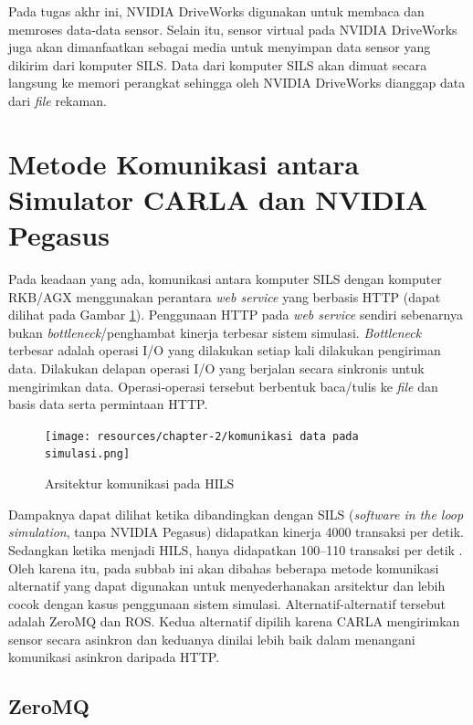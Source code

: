 Pada tugas akhr ini, NVIDIA DriveWorks digunakan untuk membaca dan
memroses data-data sensor. Selain itu, sensor virtual pada NVIDIA DriveWorks
juga akan dimanfaatkan sebagai media untuk menyimpan data sensor yang dikirim
dari komputer SILS. Data dari komputer SILS akan dimuat secara langsung ke
memori perangkat sehingga oleh NVIDIA DriveWorks dianggap data dari
\textit{file} rekaman.

\section{Metode Komunikasi antara Simulator CARLA dan NVI\-DI\-A Pegasus}

Pada keadaan yang ada, komunikasi antara komputer SILS dengan komputer RKB/AGX
menggunakan perantara \textit{web service} yang berbasis HTTP (dapat dilihat
pada Gambar \ref{chapter-2-old-hils}). Penggunaan HTTP pada \textit{web service}
sendiri sebenarnya bukan \textit{bottleneck}/penghambat kinerja terbesar sistem
simulasi. \textit{Bottleneck} terbesar adalah operasi I/O yang dilakukan setiap
kali dilakukan pengiriman data. Dilakukan delapan operasi I/O yang berjalan
secara sinkronis untuk mengirimkan data. Operasi-operasi tersebut berbentuk
baca/tulis ke \textit{file} dan basis data serta permintaan HTTP.

\begin{figure}[h!]
	\centering
	\texttt{[image: resources/chapter-2/komunikasi
		data pada simulasi.png]}
	\caption{Arsitektur komunikasi pada HILS \parencite{trilaksono_laporanRispro}}
	\label{chapter-2-old-hils}
\end{figure}

Dampaknya dapat dilihat ketika dibandingkan dengan SILS (\textit{software
	in the loop simulation}, tanpa NVIDIA Pegasus) didapatkan kinerja 4000 transaksi
per detik. Sedangkan ketika menjadi HILS, hanya didapatkan 100--110 transaksi per
detik \parencite{trilaksono_laporanRispro}. Oleh karena itu, pada subbab ini
akan dibahas beberapa metode komunikasi alternatif yang dapat digunakan untuk
menyederhanakan arsitektur dan lebih cocok dengan kasus penggunaan sistem
simulasi. Alternatif-alternatif tersebut adalah ZeroMQ dan ROS. Kedua alternatif
dipilih karena CARLA mengirimkan sensor secara asinkron dan keduanya dinilai
lebih baik dalam menangani komunikasi asinkron daripada HTTP.

\subsection{ZeroMQ}

